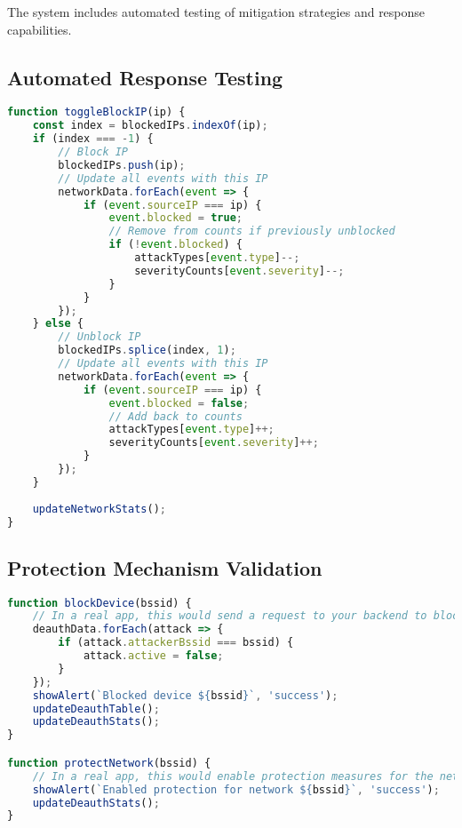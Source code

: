 \documentclass[12pt,a4paper]{report}
\begin{document}
The system includes automated testing of mitigation strategies and response capabilities.

\subsection{Automated Response Testing}

\begin{lstlisting}[language=JavaScript,caption={Automated IP Blocking Test}]
function toggleBlockIP(ip) {
    const index = blockedIPs.indexOf(ip);
    if (index === -1) {
        // Block IP
        blockedIPs.push(ip);
        // Update all events with this IP
        networkData.forEach(event => {
            if (event.sourceIP === ip) {
                event.blocked = true;
                // Remove from counts if previously unblocked
                if (!event.blocked) {
                    attackTypes[event.type]--;
                    severityCounts[event.severity]--;
                }
            }
        });
    } else {
        // Unblock IP
        blockedIPs.splice(index, 1);
        // Update all events with this IP
        networkData.forEach(event => {
            if (event.sourceIP === ip) {
                event.blocked = false;
                // Add back to counts
                attackTypes[event.type]++;
                severityCounts[event.severity]++;
            }
        });
    }
    
    updateNetworkStats();
}
\end{lstlisting}

\subsection{Protection Mechanism Validation}

\begin{lstlisting}[language=JavaScript,caption={Network Protection Testing}]
function blockDevice(bssid) {
    // In a real app, this would send a request to your backend to block the device
    deauthData.forEach(attack => {
        if (attack.attackerBssid === bssid) {
            attack.active = false;
        }
    });
    showAlert(`Blocked device ${bssid}`, 'success');
    updateDeauthTable();
    updateDeauthStats();
}

function protectNetwork(bssid) {
    // In a real app, this would enable protection measures for the network
    showAlert(`Enabled protection for network ${bssid}`, 'success');
    updateDeauthStats();
}
\end{lstlisting}
\end{document}
